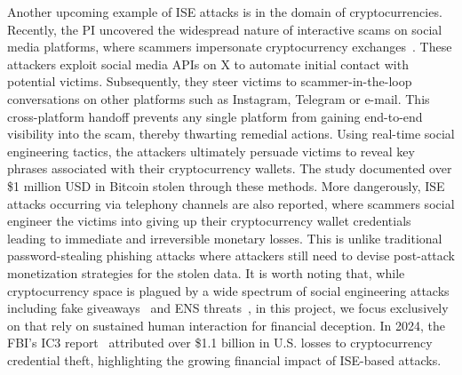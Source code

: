  Another upcoming example of ISE attacks is in the domain of cryptocurrencies. Recently, the PI uncovered the widespread nature of interactive scams on social media platforms, where scammers impersonate cryptocurrency exchanges~\cite{honeytweets}. These attackers exploit social media APIs on X to automate initial contact with potential victims. Subsequently, they steer victims to scammer-in-the-loop conversations on other platforms such as Instagram, Telegram or e-mail. This cross-platform handoff prevents any single platform from gaining end-to-end visibility into the scam, thereby thwarting remedial actions. Using real-time social engineering tactics, the attackers ultimately persuade victims to reveal key phrases associated with their cryptocurrency wallets. The study documented over \$1 million USD in Bitcoin stolen through these methods.
More dangerously, ISE attacks occurring via telephony channels are also reported, where scammers social engineer the victims into giving up their cryptocurrency wallet credentials~\cite{coinbase_psa,ic3_crypto_psa} leading to immediate and irreversible monetary losses. This is unlike traditional password-stealing phishing attacks where attackers still need to devise post-attack monetization strategies for the stolen data. 
It is worth noting that, while cryptocurrency space is plagued by a wide spectrum of social engineering attacks including fake giveaways~\cite{LiLG23,0001KMISTTVM24,LiYN23} and ENS threats~\cite{MuzammilWBN24,MuzammilWHKN24}, in this project, we focus exclusively on that rely on sustained human interaction for financial deception. In 2024, the FBI's IC3 report~\cite{ic3_report_24} attributed over \$1.1 billion in U.S. losses to cryptocurrency credential theft, highlighting the growing financial impact of ISE-based attacks.

